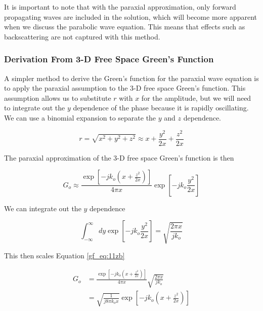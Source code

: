 It is important to note that with the paraxial approximation, only forward propagating waves are included in the solution, which will become more apparent when we discuss the parabolic wave equation. This means that effects such as backscattering are not captured with this method. 

\subsubsection{Derivation From 3-D Free Space Green's Function}
A simpler method to derive the Green's function for the paraxial wave equation is to apply the paraxial assumption to the 3-D free space Green's function. This assumption allows us to substitute $r$ with $x$ for the amplitude, but we will need to integrate out the $y$ dependence of the phase because it is rapidly oscillating. We can use a binomial expansion to separate the $y$ and $z$ dependence.

\begin{equation}
r = \sqrt{x^2+y^2+z^2} \approx x + \frac{y^2}{2x}+\frac{z^2}{2x}
\label{gf_eq:11za}
\end{equation}
 \renewcommand{\baselinestretch}{2} \small\normalsize
 
\noindent The paraxial approximation of the 3-D free space Green's function is then

\begin{equation}
G_o \approx \frac{\exp\left[-jk_o\left(x+\frac{z^2}{2x} \right)\right]}{4\pi x} \exp\left[-jk_o\frac{y^2}{2x}\right]
\label{gf_eq:11zb}
\end{equation}
 \renewcommand{\baselinestretch}{2} \small\normalsize
 
\noindent We can integrate out the $y$ dependence

\begin{equation}
\int_{-\infty}^{\infty} dy \exp\left[-jk_o\frac{y^2}{2x}\right] = \sqrt{\frac{2\pi x}{jk_o}}
\label{gf_eq:11zc}
\end{equation}
 \renewcommand{\baselinestretch}{2} \small\normalsize
 
\noindent This then scales Equation \ref{gf_eq:11zb}

\begin{equation}
\begin{aligned}
G_o &= \frac{\exp\left[-jk_o\left(x+\frac{z^2}{2x} \right)\right]}{4\pi x} \sqrt{\frac{2\pi x}{jk_o}}\\
&= \sqrt{\frac{1}{j8\pi k_o x}}\exp\left[-jk_o\left(x+\frac{z^2}{2x} \right)\right]
\label{gf_eq:11zd}
\end{aligned}
\end{equation}
 \renewcommand{\baselinestretch}{2} \small\normalsize
 
